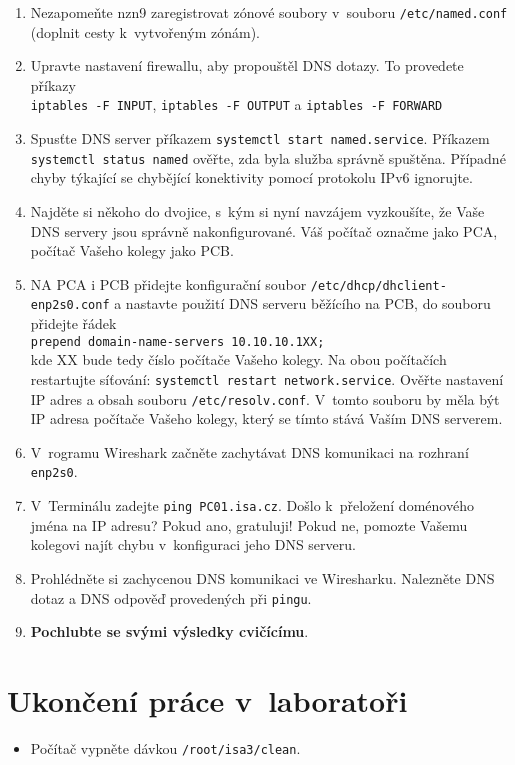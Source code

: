\begin{enumerate}
  \item Nezapomeňte nzn9 zaregistrovat zónové soubory v~souboru {\tt /etc/named.conf} (doplnit cesty k~vytvořeným zónám).
  \item Upravte nastavení firewallu, aby propouštěl DNS dotazy. To provedete příkazy \\{\tt iptables -F INPUT}, {\tt iptables -F OUTPUT} a {\tt iptables -F FORWARD}

  \item Spusťte DNS server příkazem {\tt systemctl start named.service}.
    Příkazem {\tt systemctl status named} ověřte, zda byla služba správně spuštěna.
    Případné chyby týkající se chybějící konektivity pomocí protokolu IPv6 ignorujte.

  \item Najděte si někoho do dvojice, s~kým si nyní navzájem vyzkoušíte, že Vaše DNS servery jsou správně nakonfigurované.
        Váš počítač označme jako PCA, počítač Vašeho kolegy jako PCB.
  \item NA PCA i PCB přidejte konfigurační soubor {\tt /etc/dhcp/dhclient-enp2s0.conf} a nastavte
    použití DNS serveru běžícího na PCB, do souboru přidejte řádek \\
    {\tt prepend domain-name-servers 10.10.10.1XX;} \\
    kde XX bude tedy číslo počítače Vašeho kolegy. 
    Na obou počítačích restartujte síťování: {\tt systemctl restart network.service}.
    Ověřte nastavení IP adres a obsah souboru {\tt /etc/resolv.conf}. V~tomto souboru by měla být IP adresa počítače Vašeho kolegy, který se tímto stává Vaším DNS serverem.
  \item V~rogramu Wireshark začněte zachytávat DNS komunikaci na rozhraní {\tt enp2s0}.
  \item V~Terminálu zadejte {\tt ping PC01.isa.cz}. Došlo k~přeložení doménového jména na IP adresu? Pokud ano, gratuluji! Pokud ne, pomozte Vašemu kolegovi najít chybu
    v~konfiguraci jeho DNS serveru.
  \item Prohlédněte si zachycenou DNS komunikaci ve Wiresharku. Nalezněte DNS dotaz a DNS odpověď provedených při {\tt pingu}.
  
  \item {\bf Pochlubte se svými výsledky cvičícímu}.
\end{enumerate}




\section{Ukončení práce v~laboratoři}
\begin{itemize}
  \item Počítač vypněte dávkou {\tt /root/isa3/clean}.
\end{itemize}
